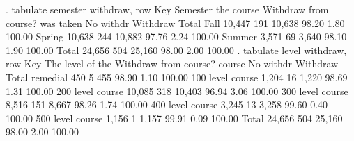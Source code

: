 . tabulate semester withdraw, row
{\smallskip}
{\TLC}
{\VBAR} Key            {\VBAR}
{\LFTT}
{\VBAR}   {}    {\VBAR}
{\VBAR} {} {\VBAR}
{\BLC}
{\smallskip}
  Semester {\VBAR}
the course {\VBAR} Withdraw from course?
 was taken {\VBAR} No withdr   Withdraw {\VBAR}     Total
      Fall {\VBAR}    10,447        191 {\VBAR}    10,638 
           {\VBAR}     98.20       1.80 {\VBAR}    100.00 
    Spring {\VBAR}    10,638        244 {\VBAR}    10,882 
           {\VBAR}     97.76       2.24 {\VBAR}    100.00 
    Summer {\VBAR}     3,571         69 {\VBAR}     3,640 
           {\VBAR}     98.10       1.90 {\VBAR}    100.00 
     Total {\VBAR}    24,656        504 {\VBAR}    25,160 
           {\VBAR}     98.00       2.00 {\VBAR}    100.00 
{\smallskip}
. tabulate level withdraw, row
{\smallskip}
{\TLC}
{\VBAR} Key            {\VBAR}
{\LFTT}
{\VBAR}   {}    {\VBAR}
{\VBAR} {} {\VBAR}
{\BLC}
{\smallskip}
The level of the {\VBAR} Withdraw from course?
          course {\VBAR} No withdr   Withdraw {\VBAR}     Total
        remedial {\VBAR}       450          5 {\VBAR}       455 
                 {\VBAR}     98.90       1.10 {\VBAR}    100.00 
100 level course {\VBAR}     1,204         16 {\VBAR}     1,220 
                 {\VBAR}     98.69       1.31 {\VBAR}    100.00 
200 level course {\VBAR}    10,085        318 {\VBAR}    10,403 
                 {\VBAR}     96.94       3.06 {\VBAR}    100.00 
300 level course {\VBAR}     8,516        151 {\VBAR}     8,667 
                 {\VBAR}     98.26       1.74 {\VBAR}    100.00 
400 level course {\VBAR}     3,245         13 {\VBAR}     3,258 
                 {\VBAR}     99.60       0.40 {\VBAR}    100.00 
500 level course {\VBAR}     1,156          1 {\VBAR}     1,157 
                 {\VBAR}     99.91       0.09 {\VBAR}    100.00 
           Total {\VBAR}    24,656        504 {\VBAR}    25,160 
                 {\VBAR}     98.00       2.00 {\VBAR}    100.00 
{\smallskip}
